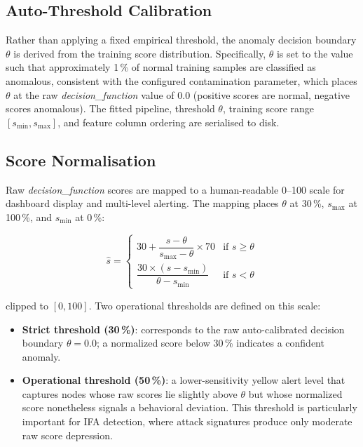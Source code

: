 \documentclass[12pt]{report}
\begin{document}
\subsection{Auto-Threshold Calibration}

Rather than applying a fixed empirical threshold, the anomaly decision boundary $\theta$ is derived from the training score distribution. Specifically, $\theta$ is set to the value such that approximately 1\,\% of normal training samples are classified as anomalous, consistent with the configured contamination parameter, which places $\theta$ at the raw \textit{decision\_function} value of $0.0$ (positive scores are normal, negative scores anomalous). The fitted pipeline, threshold $\theta$, training score range $[s_{\min}, s_{\max}]$, and feature column ordering are serialised to disk.

\subsection{Score Normalisation}

Raw \textit{decision\_function} scores are mapped to a human-readable 0--100 scale for dashboard display and multi-level alerting. The mapping places $\theta$ at 30\,\%, $s_{\max}$ at 100\,\%, and $s_{\min}$ at 0\,\%:

\begin{equation}
\hat{s} =
\begin{cases}
30 + \dfrac{s - \theta}{s_{\max} - \theta} \times 70 & \text{if } s \ge \theta \\[8pt]
\dfrac{30 \times (s - s_{\min})}{\theta - s_{\min}} & \text{if } s < \theta
\end{cases}
\end{equation}

\noindent clipped to $[0, 100]$. Two operational thresholds are defined on this scale:

\begin{itemize}
    \item \textbf{Strict threshold (30\,\%)}: corresponds to the raw auto-calibrated decision boundary $\theta = 0.0$; a normalized score below 30\,\% indicates a confident anomaly.
    \item \textbf{Operational threshold (50\,\%)}: a lower-sensitivity yellow alert level that captures nodes whose raw scores lie slightly above $\theta$ but whose normalized score nonetheless signals a behavioral deviation. This threshold is particularly important for IFA detection, where attack signatures produce only moderate raw score depression.
\end{itemize}
\end{document}
